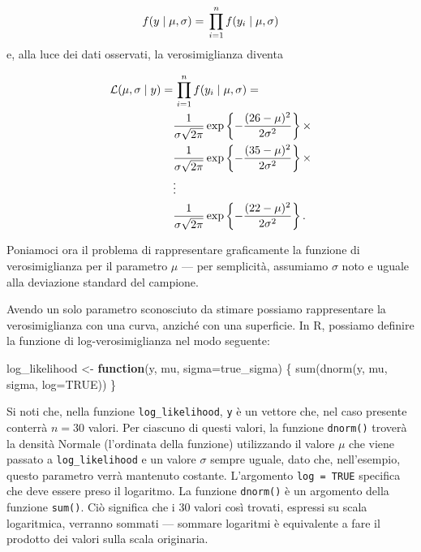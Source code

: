 \documentclass[
]{memoir}
\newenvironment{Shaded}{\begin{snugshade}}{\end{snugshade}}
\newcommand{\AttributeTok}[1]{\textcolor[rgb]{0.77,0.63,0.00}{#1}}
\newcommand{\ConstantTok}[1]{\textcolor[rgb]{0.00,0.00,0.00}{#1}}
\newcommand{\ControlFlowTok}[1]{\textcolor[rgb]{0.13,0.29,0.53}{\textbf{#1}}}
\newcommand{\FunctionTok}[1]{\textcolor[rgb]{0.00,0.00,0.00}{#1}}
\newcommand{\NormalTok}[1]{#1}
\newcommand{\OtherTok}[1]{\textcolor[rgb]{0.56,0.35,0.01}{#1}}
\newcommand{\SpecialCharTok}[1]{\textcolor[rgb]{0.00,0.00,0.00}{#1}}
\newcommand{\R}{\textsf{R}} %
\theoremstyle{definition}
\theoremstyle{definition}
\theoremstyle{definition}
\theoremstyle{definition}
\theoremstyle{remark}
\begin{document}
\[
f(y \mid \mu, \sigma) = \, \prod_{i=1}^n f(y_i \mid \mu, \sigma)\notag
\]
e, alla luce dei dati osservati, la verosimiglianza diventa

\[
\begin{aligned}
\mathcal{L}(\mu, \sigma \mid y) =& \, \prod_{i=1}^n f(y_i \mid \mu, \sigma) = \notag\\
& \frac{1}{{\sigma \sqrt {2\pi}}}\exp\left\{{-\frac{(26 - \mu)^2}{2\sigma^2}}\right\} \times \notag\\
 & \frac{1}{{\sigma \sqrt {2\pi}}}\exp\left\{{-\frac{(35 - \mu)^2}{2\sigma^2}}\right\} \times  \notag\\
& \vdots \notag\\
 & \frac{1}{{\sigma \sqrt {2\pi}}}\exp\left\{{-\frac{(22 - \mu)^2}{2\sigma^2}}\right\}.
\end{aligned}
\label{eq:lldepression}
\]

Poniamoci ora il problema di rappresentare graficamente la funzione di verosimiglianza per il parametro \(\mu\) --- per semplicità, assumiamo \(\sigma\) noto e uguale alla deviazione standard del campione.

\begin{Shaded}
\end{Shaded}

Avendo un solo parametro sconosciuto da stimare possiamo rappresentare la verosimiglianza con una curva, anziché con una superficie. In \R, possiamo definire la funzione di log-verosimiglianza nel modo seguente:

\begin{Shaded}
\begin{Highlighting}[]
\NormalTok{log\_likelihood }\OtherTok{\textless{}{-}} \ControlFlowTok{function}\NormalTok{(y, mu, }\AttributeTok{sigma=}\NormalTok{true\_sigma) \{}
  \FunctionTok{sum}\NormalTok{(}\FunctionTok{dnorm}\NormalTok{(y, mu, sigma, }\AttributeTok{log=}\ConstantTok{TRUE}\NormalTok{))}
\NormalTok{\}}
\end{Highlighting}
\end{Shaded}

Si noti che, nella funzione \texttt{log\_likelihood}, \texttt{y} è un vettore che, nel caso presente conterrà \(n = 30\) valori. Per ciascuno di questi valori, la funzione \texttt{dnorm()} troverà la densità Normale (l'ordinata della funzione) utilizzando il valore \(\mu\) che viene passato a \texttt{log\_likelihood} e un valore \(\sigma\) sempre uguale, dato che, nell'esempio, questo parametro verrà mantenuto costante. L'argomento \texttt{log\ =\ TRUE} specifica che deve essere preso il logaritmo. La funzione \texttt{dnorm()} è un argomento della funzione \texttt{sum()}. Ciò significa che i 30 valori così trovati, espressi su scala logaritmica, verranno sommati --- sommare logaritmi è equivalente a fare il prodotto dei valori sulla scala originaria.
\end{document}
